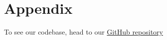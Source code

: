 \section{Appendix}\label{sec:appendix}
To see our codebase, head to our \href{https://github.com/ShivamAmratlalPatel/M2RGroupProject}{GitHub repository}
\listofalgorithms
\listoffigures